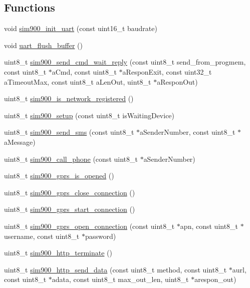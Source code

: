 \subsection*{Functions}
\begin{DoxyCompactItemize}
\item 
void \hyperlink{group__ex4__sim900_ga81bba46c55a48d6cc098174f79b0fbb4}{sim900\-\_\-init\-\_\-uart} (const uint16\-\_\-t baudrate)
\item 
void \hyperlink{group__ex4__sim900_gad29f870554063956bd7d7d67fd80c7a6}{uart\-\_\-flush\-\_\-buffer} ()
\item 
uint8\-\_\-t \hyperlink{group__ex4__sim900_gaef77b2b930353c3e38dd66ea256fcbd5}{sim900\-\_\-send\-\_\-cmd\-\_\-wait\-\_\-reply} (const uint8\-\_\-t send\-\_\-from\-\_\-progmem, const uint8\-\_\-t $\ast$a\-Cmd, const uint8\-\_\-t $\ast$a\-Respon\-Exit, const uint32\-\_\-t a\-Timeout\-Max, const uint8\-\_\-t a\-Len\-Out, uint8\-\_\-t $\ast$a\-Respon\-Out)
\item 
uint8\-\_\-t \hyperlink{group__ex4__sim900_ga695361a574ee1bc5e7b29bde955cd8c6}{sim900\-\_\-is\-\_\-network\-\_\-registered} ()
\item 
uint8\-\_\-t \hyperlink{group__ex4__sim900_gaf973888edbf27f2fb8fd8e6adb8b162d}{sim900\-\_\-setup} (const uint8\-\_\-t is\-Waiting\-Device)
\item 
uint8\-\_\-t \hyperlink{group__ex4__sim900_ga5346c5b1f1289a05cab2637e51c6dae4}{sim900\-\_\-send\-\_\-sms} (const uint8\-\_\-t $\ast$a\-Sender\-Number, const uint8\-\_\-t $\ast$a\-Message)
\item 
uint8\-\_\-t \hyperlink{group__ex4__sim900_gaddb04940d1f436d2ef80cd768961611c}{sim900\-\_\-call\-\_\-phone} (const uint8\-\_\-t $\ast$a\-Sender\-Number)
\item 
uint8\-\_\-t \hyperlink{group__ex4__sim900_gaa9eb7f49dcf29fa2f649edc113f314b3}{sim900\-\_\-gprs\-\_\-is\-\_\-opened} ()
\item 
uint8\-\_\-t \hyperlink{group__ex4__sim900_ga2a6335f2bdaaee1c5bba7b48f43f1cf2}{sim900\-\_\-gprs\-\_\-close\-\_\-connection} ()
\item 
uint8\-\_\-t \hyperlink{group__ex4__sim900_gaa46f662b2663cb8e70fd6d026b533959}{sim900\-\_\-gprs\-\_\-start\-\_\-connection} ()
\item 
uint8\-\_\-t \hyperlink{group__ex4__sim900_ga87e5ed2c9a3354421755ae30b43d92a8}{sim900\-\_\-gprs\-\_\-open\-\_\-connection} (const uint8\-\_\-t $\ast$apn, const uint8\-\_\-t $\ast$username, const uint8\-\_\-t $\ast$password)
\item 
uint8\-\_\-t \hyperlink{group__ex4__sim900_ga181560b7fbd0457bbc5eb2478e6fbbdf}{sim900\-\_\-http\-\_\-terminate} ()
\item 
uint8\-\_\-t \hyperlink{group__ex4__sim900_ga01d34a6c249d5bfd4e6bc98fb9d872cd}{sim900\-\_\-http\-\_\-send\-\_\-data} (const uint8\-\_\-t method, const uint8\-\_\-t $\ast$aurl, const uint8\-\_\-t $\ast$adata, const uint8\-\_\-t max\-\_\-out\-\_\-len, uint8\-\_\-t $\ast$arespon\-\_\-out)
\end{DoxyCompactItemize}


